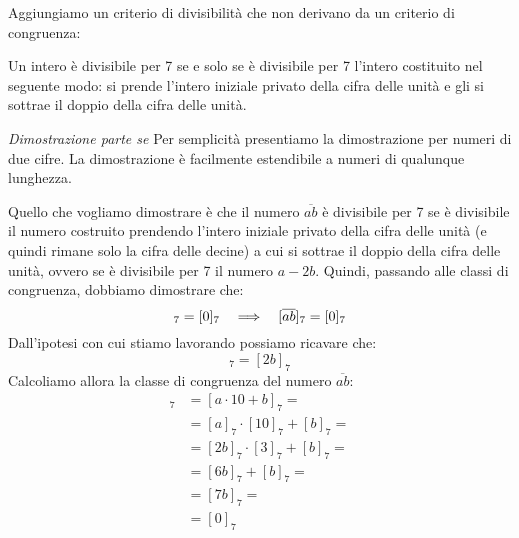 Aggiungiamo un criterio di divisibilità che non derivano da un criterio di congruenza:

    \begin{teorema}
        Un intero è divisibile per 7 se e solo se è divisibile per 7 l'intero costituito nel seguente modo: si prende l'intero iniziale privato della cifra delle unità e gli si sottrae il doppio della cifra delle unità.
    \end{teorema}
    \begin{dimostrazione}
        \emph{Dimostrazione parte se}
        Per semplicità presentiamo la dimostrazione per numeri di due cifre. La dimostrazione è facilmente estendibile a numeri di qualunque lunghezza.

        Quello che vogliamo dimostrare è che il numero $\overline{ab}$ è divisibile per 7 se è divisibile il numero costruito prendendo l'intero iniziale privato della cifra delle unità (e quindi rimane solo la cifra delle decine) a cui si sottrae il doppio della cifra delle unità, ovvero se è divisibile per 7 il numero $a - 2b$. Quindi, passando alle classi di congruenza, dobbiamo dimostrare che:
        \begin{equation*}
            [a - 2b]_7 = [0]_7 \allora [\overline{ab}]_7 = [0]_7
        \end{equation*}
        Dall'ipotesi con cui stiamo lavorando possiamo ricavare che:
        \begin{equation*}
            [a]_7 = [2b]_7
        \end{equation*}
        Calcoliamo allora la classe di congruenza del numero $\overline{ab}$:
        \begin{align*}
            [\overline{ab}]_7 &= [a \cdot 10 + b]_7 = \\
            &= [a]_7 \cdot [10]_7 + [b]_7 =\\
            &= [2b]_7 \cdot [3]_7 + [b]_7 =\\
            &= [6b]_7 + [b]_7 =\\
            &= [7b]_7 =\\
            &= [0]_7
        \end{align*}
        
    \end{dimostrazione}



